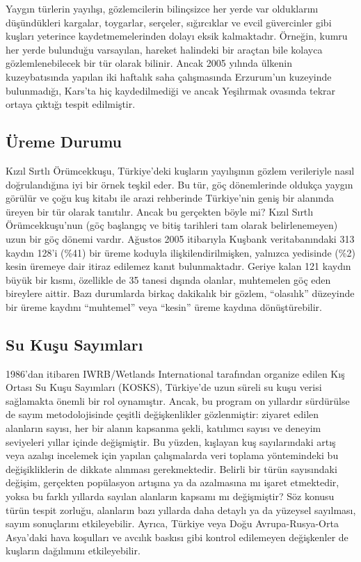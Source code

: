 \documentclass[
  a4paper,
  DIV=11,
  numbers=noendperiod]{scrreprt}
\begin{document}
Yaygın türlerin yayılışı, gözlemcilerin bilinçsizce her yerde var
olduklarını düşündükleri kargalar, toygarlar, serçeler, sığırcıklar ve
evcil güvercinler gibi kuşları yeterince kaydetmemelerinden dolayı eksik
kalmaktadır. Örneğin, kumru her yerde bulunduğu varsayılan, hareket
halindeki bir araçtan bile kolayca gözlemlenebilecek bir tür olarak
bilinir. Ancak 2005 yılında ülkenin kuzeybatısında yapılan iki haftalık
saha çalışmasında Erzurum'un kuzeyinde bulunmadığı, Kars'ta hiç
kaydedilmediği ve ancak Yeşilırmak ovasında tekrar ortaya çıktığı tespit
edilmiştir.

\subsection*{Üreme Durumu}\label{uxfcreme-durumu}

Kızıl Sırtlı Örümcekkuşu, Türkiye'deki kuşların yayılışının gözlem
verileriyle nasıl doğrulandığına iyi bir örnek teşkil eder. Bu tür, göç
dönemlerinde oldukça yaygın görülür ve çoğu kuş kitabı ile arazi
rehberinde Türkiye'nin geniş bir alanında üreyen bir tür olarak
tanıtılır. Ancak bu gerçekten böyle mi? Kızıl Sırtlı Örümcekkuşu'nun
(göç başlangıç ve bitiş tarihleri tam olarak belirlenemeyen) uzun bir
göç dönemi vardır. Ağustos 2005 itibarıyla Kuşbank veritabanındaki 313
kaydın 128'i (\%41) bir üreme koduyla ilişkilendirilmişken, yalnızca
yedisinde (\%2) kesin üremeye dair itiraz edilemez kanıt bulunmaktadır.
Geriye kalan 121 kaydın büyük bir kısmı, özellikle de 35 tanesi dışında
olanlar, muhtemelen göç eden bireylere aittir. Bazı durumlarda birkaç
dakikalık bir gözlem, ``olasılık'' düzeyinde bir üreme kaydını
``muhtemel'' veya ``kesin'' üreme kaydına dönüştürebilir.

\subsection*{Su Kuşu Sayımları}\label{su-kuux15fu-sayux131mlarux131}

1986'dan itibaren IWRB/Wetlands International tarafından organize edilen
Kış Ortası Su Kuşu Sayımları (KOSKS), Türkiye'de uzun süreli su kuşu
verisi sağlamakta önemli bir rol oynamıştır. Ancak, bu program on
yıllardır sürdürülse de sayım metodolojisinde çeşitli değişkenlikler
gözlenmiştir: ziyaret edilen alanların sayısı, her bir alanın kapsanma
şekli, katılımcı sayısı ve deneyim seviyeleri yıllar içinde değişmiştir.
Bu yüzden, kışlayan kuş sayılarındaki artış veya azalışı incelemek için
yapılan çalışmalarda veri toplama yöntemindeki bu değişikliklerin de
dikkate alınması gerekmektedir. Belirli bir türün sayısındaki değişim,
gerçekten popülasyon artışına ya da azalmasına mı işaret etmektedir,
yoksa bu farklı yıllarda sayılan alanların kapsamı mı değişmiştir? Söz
konusu türün tespit zorluğu, alanların bazı yıllarda daha detaylı ya da
yüzeysel sayılması, sayım sonuçlarını etkileyebilir. Ayrıca, Türkiye
veya Doğu Avrupa-Rusya-Orta Asya'daki hava koşulları ve avcılık baskısı
gibi kontrol edilemeyen değişkenler de kuşların dağılımını
etkileyebilir.
\end{document}
